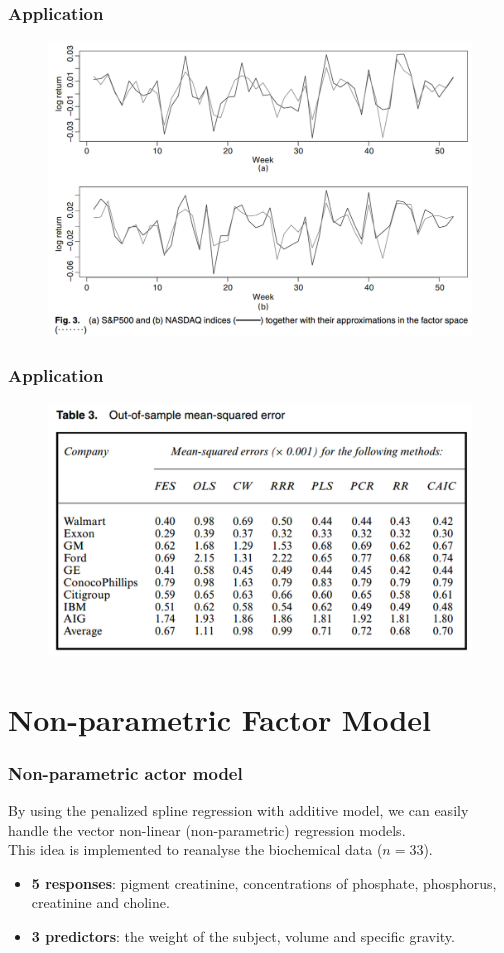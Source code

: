 \documentclass{beamer}
\begin{document}
	
	\begin{frame}
		\frametitle{Application}
		\begin{figure}
			\includegraphics[width=.7\linewidth]{image011.png}
		\end{figure}
	\end{frame}
	
	\begin{frame}
		\frametitle{Application}
		\begin{figure}
			\includegraphics[width=.7\linewidth]{image012.png}
		\end{figure}
	\end{frame}
	
	\section{Non-parametric Factor Model}
	
	\begin{frame}
		\frametitle{Non-parametric actor model}
		By using the penalized spline regression with additive model, we can easily handle the vector non-linear (non-parametric) regression models.\\
		\vspace{\baselineskip}
		This idea is implemented to reanalyse the biochemical data ($n = 33$).\\
		\begin{itemize}
			\item 
			\textbf{5 responses}: pigment creatinine, concentrations of phosphate, phosphorus, creatinine and choline.
			\item
			\textbf{3 predictors}: the weight of the subject, volume and specific gravity.
		\end{itemize}
	\end{frame}
	
\end{document}
